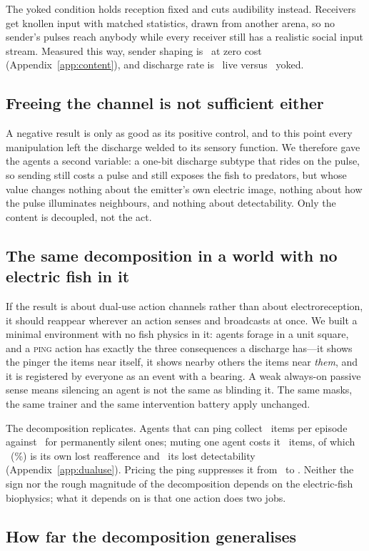 The yoked condition holds reception fixed and cuts audibility instead. Receivers
get knollen input with matched statistics, drawn from another arena, so no
sender's pulses reach anybody while every receiver still has a realistic social
input stream. Measured this way, sender shaping is \SSIYokeZero\ at zero cost
(Appendix~\ref{app:content}), and discharge rate is \EmitLiveZero\ live versus
\EmitYokeZero\ yoked. \YOKEDVERDICT


\subsection{Freeing the channel is not sufficient either}

A negative result is only as good as its positive control, and to this point every
manipulation left the discharge welded to its sensory function. We therefore gave
the agents a second variable: a one-bit discharge subtype that rides on the pulse,
so sending still costs a pulse and still exposes the fish to predators, but whose
value changes nothing about the emitter's own electric image, nothing about how
the pulse illuminates neighbours, and nothing about detectability. Only the
content is decoupled, not the act. \DECOUPLEDRESULT

\subsection{The same decomposition in a world with no electric fish in it}

If the result is about dual-use action channels rather than about
electroreception, it should reappear wherever an action senses and broadcasts at
once. We built a minimal environment with no fish physics in it: agents forage in
a unit square, and a \textsc{ping} action has exactly the three consequences a
discharge has---it shows the pinger the items near itself, it shows nearby others
the items near \emph{them}, and it is registered by everyone as an event with a
bearing. A weak always-on passive sense means silencing an agent is not the same
as blinding it. The same masks, the same trainer and the same intervention battery
apply unchanged.

The decomposition replicates. Agents that can ping collect \DUFull\ items per
episode against \DUSilent\ for permanently silent ones; muting one agent costs it
\DUTotal\ items, of which \DUPriv\ (\DUPrivFrac\%) is its own lost reafference and
\DUSig\ its lost detectability (Appendix~\ref{app:dualuse}). Pricing the ping
suppresses it from \DUPingLo\ to \DUPingHi. Neither the sign nor the rough
magnitude of the decomposition depends on the electric-fish biophysics; what it
depends on is that one action does two jobs.


\subsection{How far the decomposition generalises}

\GENERALISATION



